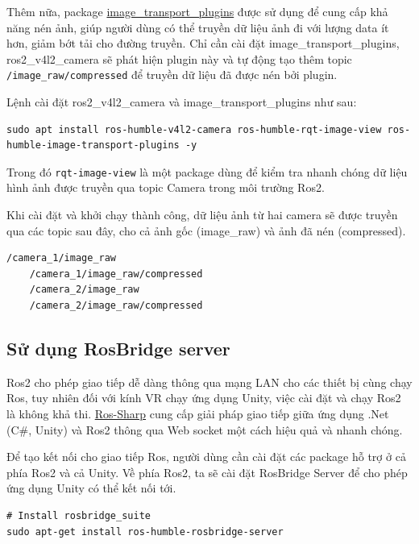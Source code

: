 Thêm nữa, package \href{https://github.com/ros-perception/image_transport_plugins}{image\_transport\_plugins} được sử dụng để cung cấp khả năng nén ảnh, giúp người dùng có thể truyền dữ liệu ảnh đi với lượng data ít hơn, giảm bớt tải cho đường truyền. Chỉ cần cài đặt image\_transport\_plugins, ros2\_v4l2\_camera sẽ phát hiện plugin này và tự động tạo thêm topic \lstinline[style=inlinecode]{/image_raw/compressed} để truyền dữ liệu đã được nén bởi plugin.

Lệnh cài đặt ros2\_v4l2\_camera và image\_transport\_plugins như sau:

\begin{lstlisting}[style=bashstyle]
    sudo apt install ros-humble-v4l2-camera ros-humble-rqt-image-view ros-humble-image-transport-plugins -y
\end{lstlisting}

Trong đó \lstinline[style=inlinecode]{rqt-image-view} là một package dùng để kiểm tra nhanh chóng dữ liệu hình ảnh được truyền qua topic Camera trong môi trường Ros2.
 
Khi cài đặt và khởi chạy thành công, dữ liệu ảnh từ hai camera sẽ được truyền qua các topic sau đây, cho cả ảnh gốc (image\_raw) và ảnh đã nén (compressed).

\begin{lstlisting}[language={}]
    /camera_1/image_raw
    /camera_1/image_raw/compressed
    /camera_2/image_raw
    /camera_2/image_raw/compressed
\end{lstlisting}
 
\subsection{Sử dụng RosBridge server}

Ros2 cho phép giao tiếp dễ dàng thông qua mạng LAN cho các thiết bị cùng chạy Ros, tuy nhiên đối với kính VR chạy ứng dụng Unity, việc cài đặt và chạy Ros2 là không khả thi. \href{https://github.com/siemens/ros-sharp}{Ros-Sharp} cung cấp giải pháp giao tiếp giữa ứng dụng .Net (C\#, Unity) và Ros2 thông qua Web socket một cách hiệu quả và nhanh chóng.

Để tạo kết nối cho giao tiếp Ros, người dùng cần cài đặt các package hỗ trợ ở cả phía Ros2 và cả Unity. Về phía Ros2, ta sẽ cài đặt RosBridge Server để cho phép ứng dụng Unity có thể kết nối tới. 

\begin{lstlisting}[style=bashstyle]
# Install rosbridge_suite
sudo apt-get install ros-humble-rosbridge-server
\end{lstlisting}


